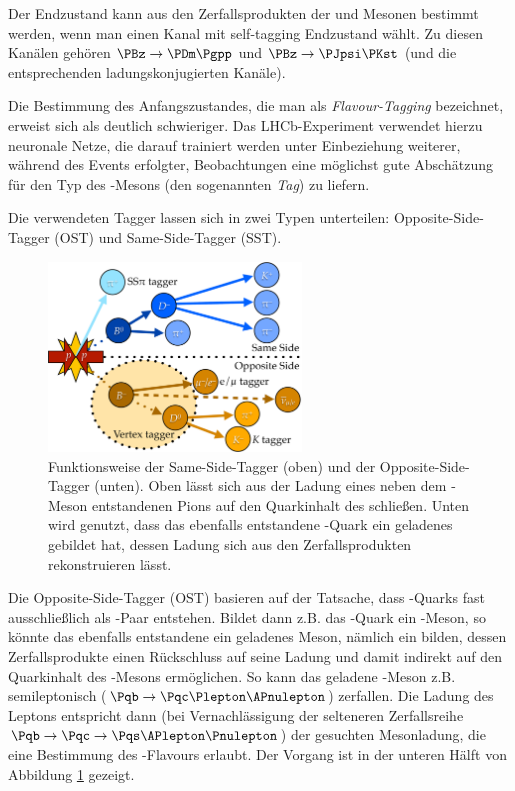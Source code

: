 Der Endzustand kann aus den Zerfallsprodukten der \PBz und \PaBz Mesonen bestimmt werden, wenn man einen Kanal mit self-tagging Endzustand wählt.
Zu diesen Kanälen gehören $\PBz \to \PDm \Pgpp$ und $\PBz \to \PJpsi \PKst$ (und die entsprechenden ladungskonjugierten Kanäle).

Die Bestimmung des Anfangszustandes, die man als \emph{Flavour-Tagging} bezeichnet, erweist sich als deutlich schwieriger.
Das LHCb-Experiment verwendet hierzu neuronale Netze, die darauf trainiert werden unter Einbeziehung weiterer, während des Events erfolgter, Beobachtungen eine möglichst gute Abschätzung für den Typ des \PB-Mesons (den sogenannten \emph{Tag}) zu liefern.

Die verwendeten Tagger lassen sich in zwei Typen unterteilen: Opposite-Side-Tagger (OST) und Same-Side-Tagger (SST).

\begin{figure}
  \centering
  \includegraphics[width=0.6\textwidth]{figures/tagging.pdf}
  \caption{Funktionsweise der Same-Side-Tagger (oben) und der Opposite-Side-Tagger (unten). Oben lässt sich aus der Ladung eines neben dem \PB-Meson entstandenen Pions auf den Quarkinhalt des \PB schließen. Unten wird genutzt, dass das ebenfalls entstandene \Pqb-Quark ein geladenes \PBm gebildet hat, dessen Ladung sich aus den Zerfallsprodukten rekonstruieren lässt.}
  \label{tagging}
\end{figure}

Die Opposite-Side-Tagger (OST) basieren auf der Tatsache, dass \Pqb-Quarks fast ausschließlich als \Pqb\Paqb-Paar entstehen. Bildet dann z.B. das \Pqb-Quark ein \PaB-Meson, so könnte das ebenfalls entstandene \Paqb ein geladenes Meson, nämlich ein \PBp bilden, dessen Zerfallsprodukte einen Rückschluss auf seine Ladung und damit indirekt auf den Quarkinhalt des \PaB-Mesons ermöglichen.
So kann das geladene \PB-Meson z.B. semileptonisch ($\Pqb \to \Pqc \Plepton \APnulepton$) zerfallen. Die Ladung des Leptons entspricht dann (bei Vernachlässigung der selteneren Zerfallsreihe $\Pqb \to \Pqc \to \Pqs \APlepton \Pnulepton$) der gesuchten Mesonladung, die eine Bestimmung des \PB-Flavours erlaubt.\cite{ost}
Der Vorgang ist in der unteren Hälft von Abbildung \ref{tagging} gezeigt.

